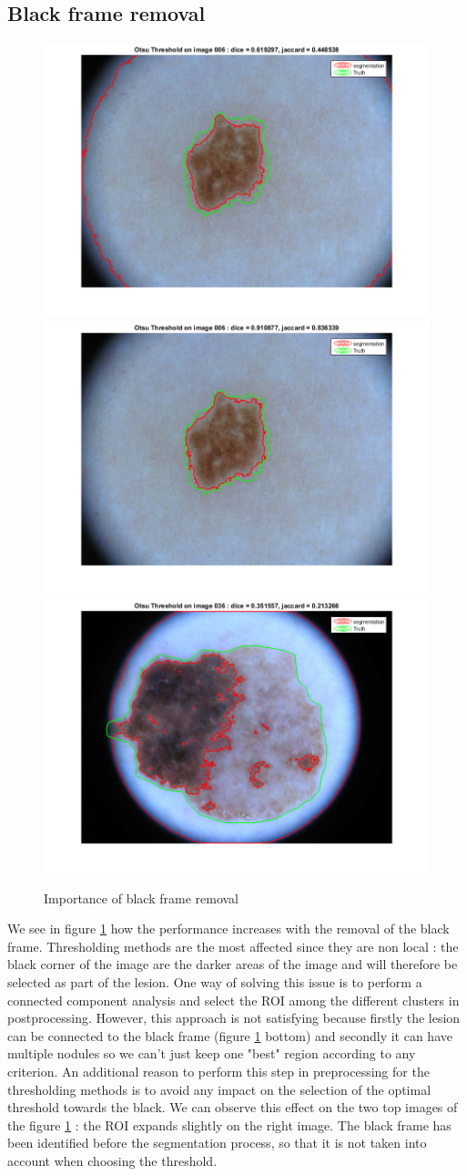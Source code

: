 \documentclass[a4paper,10pt]{article}
\begin{document}
\subsection{Black frame removal}

\begin{figure} 
	\centering
	\includegraphics[width=0.45\linewidth]{../results/blackframe/otsu_006_blackframe.png} 
	\includegraphics[width=0.45\linewidth]{../results/blackframe/otsu-segt-im-006.png} \\
	\includegraphics[width=0.5\linewidth]{../results/otsu/otsu-segt-im-036}
	\caption{Importance of black frame removal}
	\label{fig:blackframe}
\end{figure}


We see in figure \ref{fig:blackframe} how the performance increases with the removal of the black frame. Thresholding methods are the most affected since they are non local : the black corner of the image are the darker areas of the image and will therefore be selected as part of the lesion. One way of solving this issue is to perform a connected component analysis and select the ROI among the different clusters in postprocessing. However, this approach is not satisfying because firstly the lesion can be connected to the black frame (figure \ref{fig:blackframe} bottom) and secondly it can have multiple nodules so we can't just keep one "best" region according to any criterion. An additional reason to perform this step in preprocessing for the thresholding methods is to avoid any impact on the selection of the optimal threshold towards the black. We can observe this effect on the two top images of the figure \ref{fig:blackframe} : the ROI expands slightly on the right image. The black frame has been identified before the segmentation process, so that it is not taken into account when choosing the threshold.
\end{document}
